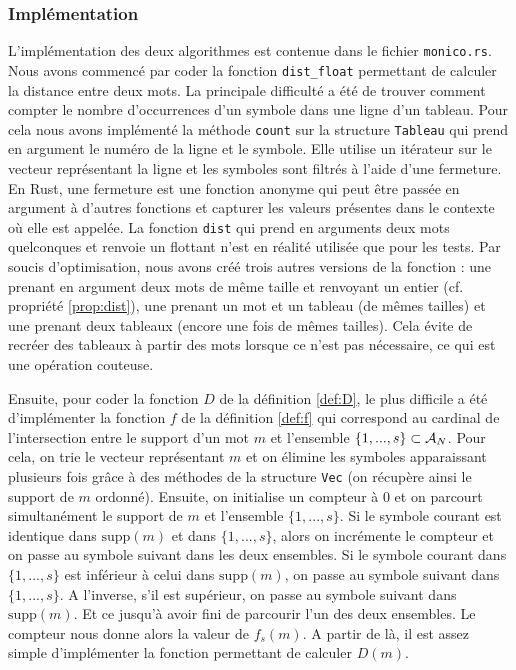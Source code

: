 \subsubsection{Implémentation}
L'implémentation des deux algorithmes est contenue dans le fichier \texttt{monico.rs}. Nous avons commencé par coder la fonction \texttt{dist\_float} permettant de calculer la distance entre deux mots. La principale difficulté a été de trouver comment compter le nombre d'occurrences d'un symbole dans une ligne d'un tableau. Pour cela nous avons implémenté la méthode \texttt{count} sur la structure \texttt{Tableau} qui prend en argument le numéro de la ligne et le symbole. Elle utilise un itérateur sur le vecteur représentant la ligne et les symboles sont filtrés à l'aide d'une fermeture. En Rust, une fermeture est une fonction anonyme qui peut être passée en argument à d'autres fonctions et capturer les valeurs présentes dans le contexte où elle est appelée. La fonction \texttt{dist} qui prend en arguments deux mots quelconques et renvoie un flottant n'est en réalité utilisée que pour les tests. Par soucis d'optimisation, nous avons créé trois autres versions de la fonction : une prenant en argument deux mots de même taille et renvoyant un entier (cf. propriété \ref{prop:dist}), une prenant un mot et un tableau (de mêmes tailles) et une prenant deux tableaux (encore une fois de mêmes tailles). Cela évite de recréer des tableaux à partir des mots lorsque ce n'est pas nécessaire, ce qui est une opération couteuse.

Ensuite, pour coder la fonction $D$ de la définition \ref{def:D}, le plus difficile a été d'implémenter la fonction $f$ de la définition \ref{def:f} qui correspond au cardinal de l'intersection entre le support d'un mot $m$ et l'ensemble $\{1,...,s\} \subset \mathcal{A}_N$. Pour cela, on trie le vecteur représentant $m$ et on élimine les symboles apparaissant plusieurs fois grâce à des méthodes de la structure \texttt{Vec} (on récupère ainsi le support de $m$ ordonné). Ensuite, on initialise un compteur à $0$ et on parcourt simultanément le support de $m$ et l'ensemble $\{1,...,s\}$. Si le symbole courant est identique dans $\text{supp}(m)$ et dans $\{1,...,s\}$, alors on incrémente le compteur et on passe au symbole suivant dans les deux ensembles. Si le symbole courant dans $\{1,...,s\}$ est inférieur à celui dans $\text{supp}(m)$, on passe au symbole suivant dans $\{1,...,s\}$. A l'inverse, s'il est supérieur, on passe au symbole suivant dans $\text{supp}(m)$. Et ce jusqu'à avoir fini de parcourir l'un des deux ensembles. Le compteur nous donne alors la valeur de $f_s(m)$. A partir de là, il est assez simple d'implémenter la fonction permettant de calculer $D(m)$.

